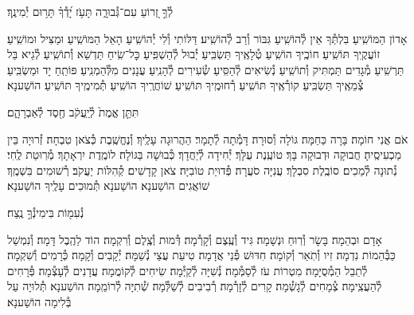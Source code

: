 \documentclass[twoside, openany, parskip=half, 11pt]{book}
\begin{document}
לְ֯ךָ֣ זְ֭רוֹעַ עִם־גְּ֯בוּרָ֑ה תָּעֹ֥ז יָ֝דְ֯ךָ֗ תָּר֥וּם יְ֯מִינֶֽךָ׃



אָדוֹן הַמּוֹשִֽׁיעַ׃ בִּלְתְּ֯ךָ אֵין לְ֯הוֹשִֽׁיעַ׃ גִּבּוֹר וְ֯רַב לְ֯הוֹשִֽׁיע׃ דַּלּוֹתִי וְ֯לִי יְ֯הוֹשִֽׁיעַ׃ הָאֵל הַמּוֹשִֽׁיעַ׃ וּמַצִּיל וּמוֹשִֽׁיעַ׃ זוֹעֲקֶֽיךָ תּוֹשִֽׁיעַ׃ חוֹכֶֽיךָ הוֹשִֽׁיעַ׃ טְ֯לָאֶֽיךָ תַּשְׂבִּֽיעַ׃ יְ֯בוּל לְ֯הַשְׁפִּֽיעַ׃ כׇּל־שִֽׂיחַ תַּדְשֵׁא וְ֯תוֹשִֽׁיעַ׃ לְ֯גֵיא בַּל תַּרְשִֽׁיעַ׃ מְ֯גָדִים תַּמְתִּיק וְ֯תוֹשִֽׁיעַ׃ נְ֯שִׂיאִים לְ֯הַסִּֽיעַ׃ שְׂ֯עִירִים לְ֯הָנִֽיעַ׃ עֲנָנִים מִלְּ֯הַמְנִֽיעַ׃ פּוֹתֵֽחַ יָד וּמַשְׂבִּֽיעַ׃ צְ֯מֵאֶֽיךָ תַּשְׂבִּֽיעַ׃ קוֹרְ֯אֶֽיךָ תּוֹשִֽׁיעַ׃ רְ֯חוּמֶֽיךָ תּוֹשִֽׁיעַ׃
שׁוֹחֲרֶֽיךָ הוֹשִֽׁיעַ׃
תְּ֯מִימֶֽיךָ תּוֹשִֽׁיעַ׃ הוֹשַׁענָא׃

תִּתֵּ֤ן אֱמֶת֙ לְ֯יַֽעֲקֹ֔ב חֶ֖סֶד לְ֯אַבְרָהָ֑ם׃


אֹם אֲנִי חוֹמָה׃ בָּרָה כַּחַמָּה׃ גּוֹלָה וְ֯סוּרָה׃ דָּמְ֯תָה לְ֯תָמָר׃ הַהֲרוּגָה עָלֶֽיךָ׃ וְ֯נֶחֱשֶֽׁבֶת כְּ֯צֹאן טִבְחָה׃ זְ֯רוּיָה בֵּין מַכְעִיסֶֽיהָ׃ חֲבוּקָה וּדְבוּקָה בָּךְ׃ טוֹעֶֽנֶת עֻלָּךְ׃ יְ֯חִידָה לְ֯יַחֲדָךְ׃ כְּ֯בוּשָׁה בַּגּוֹלָה׃ לוֹמֶֽדֶת יִרְאָתָךְ׃ מְ֯רֽוּטַת לֶֽחִי׃ נְ֯תוּנָה לְ֯מַכִים׃ סוֹבֶֽלֶת סִבְלָךְ׃ עֲנִיָּה סֹעֲרָה׃ פְּ֯דוּיַת טוֹבִיָּה׃ צֹאן קָדָשִׁים׃ קְ֯הִלּוֹת יַעֲקֹב׃ רְ֯שׁוּמִים בִּשְׁמֶֽךָ׃ שׁוֹאֲגִים הוֹשַׁענָא׃ הוֹשַׁענָא תְּ֯מוּכִים עָלֶֽיךָ הוֹשַׁענָא׃

נְ֯עִמ֖וֹת בִּימִינְ֯ךָ֣ נֶֽצַח׃


אָדָם וּבְהֵמָה׃ בָּשָׂר וְ֯רֽוּחַ וּנְשָׁמָה׃ גִּיד וְ֯עֶֽצֶם וְ֯קָרְ֯מָה׃ דְּ֯מוּת וְ֯צֶֽלֶם וְ֯רִקְמָה׃ הוֹד לַהֶֽבֶל דָּמָה׃ וְ֯נִמְשַׁל כַּבְּ֯הֵמוֹת נִדְמָה׃ זִיו וְ֯תֹֽאַר וְ֯קוֹמָה׃ חִדּוּשׁ פְּ֯נֵי אֲדָמָה׃ טִיעַת עֲצֵי נְ֯שַׁמָּה׃ יְ֯קָבִים וְ֯קָמָה׃ כְּ֯רָמִים וְ֯שִׁקְמָה׃ לְ֯תֵבֵל הַמְ֯סֻיָּמָה׃ מִטְרוֹת עֹז לְ֯סַמְּ֯מָה׃ נְ֯שִׁיָּה לְ֯קַיְּ֯מָה׃ שִׂיחִים לְ֯קוֹמֲמָה׃ עֲדָנִים לְ֯עָצְ֯מָה׃ פְּ֯רָחִים לְ֯הַעֲצִֽימָה׃ צְ֯מָחִים לְ֯גָשְׁ֯מָה׃ קָרִים לְ֯זָרְ֯מָה׃ רְ֯בִיבִים לְ֯שַׁלְּ֯מָה׃
שְׁ֯תִיָּה לְ֯רוֹמֵֽמָה׃ הוֹשַׁענָא׃
תְּ֯לוּיָה עַל בְּ֯לִימָה הוֹשַׁענָא׃
\end{document}
